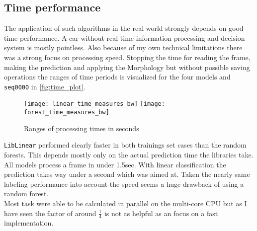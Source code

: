 \subsection{Time performance} %
\label{sub:time_costs}
The application of such algorithms in the real world strongly depends on good time performance. A car without real time information processing and decision system is mostly pointless. Also because of my own technical limitations there was a strong focus on processing speed. Stopping the time for reading the frame, making the prediction and applying the Morphology but without possible saving operations the ranges of time periods is visualized for the four models and \texttt{seq0000} in \autoref{fig:time_plot}.
\begin{figure}
	\centering
	\texttt{[image: linear\_time\_measures\_bw]}
	\texttt{[image: forest\_time\_measures\_bw]}
	\caption{Ranges of processing times in seconds}
	\label{fig:time_plot}
\end{figure}
\texttt{LibLinear} performed clearly faster in both trainings set cases than the random forests. This depends mostly only on the actual prediction time the libraries take. All models process a frame in under 1.5sec. With linear classification the prediction takes way under a second which was aimed at. Taken the nearly same labeling performance into account the speed seems a huge drawback of using a random forest.\\
Most task were able to be calculated in parallel on the multi-core CPU but as I have seen the factor of around $\frac{1}{4}$ is not as helpful as an focus on a fast implementation.
